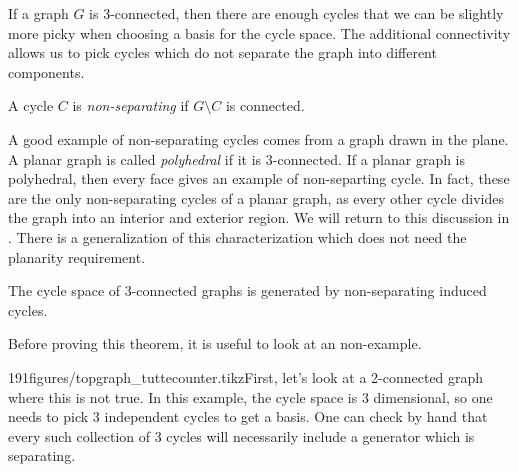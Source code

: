 If a graph $G$ is 3-connected, then there are enough cycles that we can be slightly more picky when choosing a basis for the cycle space. The additional connectivity allows us to pick cycles which do not separate the graph into different components. 
\begin{definition} A cycle $C$ is \emph{non-separating} if $G\setminus C$ is connected. 
\end{definition}
A good example of non-separating cycles comes from a graph drawn in the plane. 
A planar graph is called \emph{polyhedral} if it is 3-connected.
If a planar graph is polyhedral, then every face gives an example of non-separting cycle.
In fact, these are the only non-separating cycles of a planar graph, as every other cycle divides the graph into an interior and exterior region. We will return to this discussion in .
There is a generalization of this characterization which does not need the planarity requirement. 
\begin{theorem}[Tutte] \label{thm:3connectedgeneration}
 The cycle space of 3-connected graphs is generated by non-separating induced cycles.
\end{theorem}
Before proving this theorem, it is useful to look at an non-example.
 \begin{examplefigureenv}{191figures/topgraph_tuttecounter.tikz}First, let's look at a 2-connected graph where this is not true. In this example, the cycle space is 3 dimensional, so one needs to pick 3 independent cycles to get a basis. One can check by hand that every such collection of 3 cycles will necessarily include a generator which is separating.
 \end{examplefigureenv}

